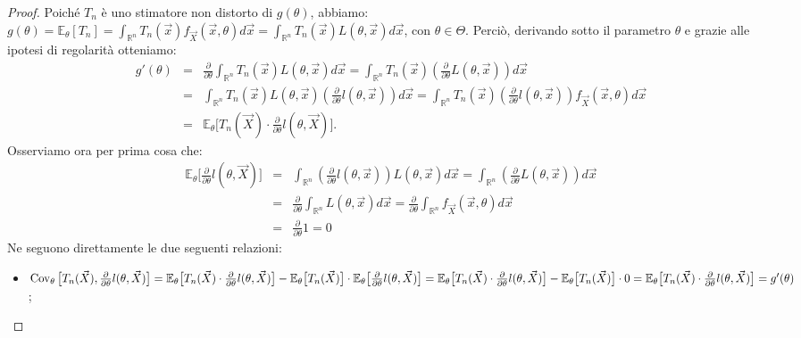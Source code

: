 \begin{proof}
Poiché $T_n$ è uno stimatore non distorto di $g(\theta)$, abbiamo:\\
$g(\theta)=\mathbb{E}_\theta [T_n]=\int_{\mathbb{R}^n} T_n(\vec{x})f_{\vec{X}}(\vec{x},\theta)d\vec{x}=\int_{\mathbb{R}^n} T_n(\vec{x})L(\theta,\vec{x})d\vec{x}$, con $\theta\in \Theta$. Perciò, derivando sotto il parametro $\theta$ e grazie alle ipotesi di regolarità otteniamo: \\
\begin{eqnarray*}
g'(\theta) &=& \frac{\partial}{\partial\theta}\int_{\mathbb{R}^n} T_n(\vec{x})L(\theta,\vec{x})d\vec{x}= \int_{\mathbb{R}^n} T_n(\vec{x})\left(\frac{\partial}{\partial\theta}L(\theta,\vec{x})\right)d\vec{x} \\
&=& \int_{\mathbb{R}^n} T_n(\vec{x})L(\theta,\vec{x})\left(\frac{\partial}{\partial\theta}l(\theta,\vec{x})\right)d\vec{x} = \int_{\mathbb{R}^n} T_n(\vec{x})\left(\frac{\partial}{\partial\theta}l(\theta,\vec{x})\right)f_{\vec{X}}(\vec{x},\theta)d\vec{x} \\
&=& \mathbb{E}_\theta \Big[T_n(\vec{X})\cdot\frac{\partial}{\partial\theta}l(\theta,\vec{X})\Big].
\end{eqnarray*}
Osserviamo ora per prima cosa che:
\begin{eqnarray*}
\mathbb{E}_\theta \Big[\frac{\partial}{\partial\theta}l(\theta,\vec{X})\Big] &= & \int_{\mathbb{R}^n}  \left(\frac{\partial}{\partial\theta}l(\theta,\vec{x})\right)L(\theta,\vec{x})d\vec{x}=\int_{\mathbb{R}^n} \left(\frac{\partial}{\partial\theta}L(\theta,\vec{x})\right)d\vec{x}\\
&=& \frac{\partial}{\partial\theta}\int_{\mathbb{R}^n}L(\theta,\vec{x})d\vec{x}=\frac{\partial}{\partial\theta}\int_{\mathbb{R}^n}f_{\vec{X}}(\vec{x},\theta)d\vec{x}\\ 
&=& \frac{\partial}{\partial\theta} 1=0
\end{eqnarray*}
Ne seguono direttamente le due seguenti relazioni:
\begin{itemize}
\item $\operatorname{Cov}_\theta \big[T_n(\vec{X}),\frac{\partial}{\partial\theta}l(\theta,\vec{X})\big]=\mathbb{E}_\theta\big[T_n(\vec{X})\cdot\frac{\partial}{\partial\theta}l(\theta,\vec{X})\big]-\mathbb{E}_\theta\big[T_n(\vec{X})\big]\cdot \mathbb{E}_\theta\big[\frac{\partial}{\partial\theta}l(\theta,\vec{X})\big]=\mathbb{E}_\theta\big[T_n(\vec{X})\cdot\frac{\partial}{\partial\theta}l(\theta,\vec{X})\big]-\mathbb{E}_\theta\big[T_n(\vec{X})\big]\cdot 0=\mathbb{E}_\theta\big[T_n(\vec{X})\cdot\frac{\partial}{\partial\theta}l(\theta,\vec{X})\big]=g'(\theta)$;


\end{itemize}
\end{proof}
